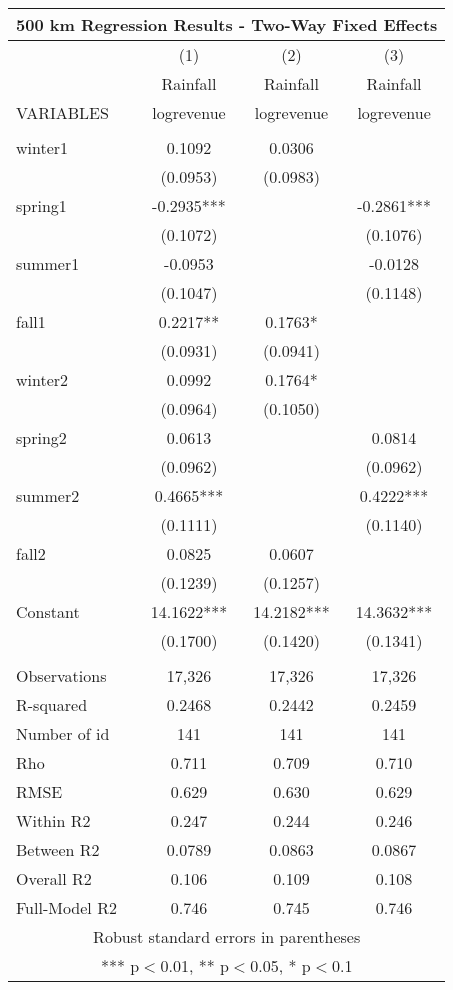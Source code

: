 \documentclass[]{article}
\begin{document}
\begin{tabular}{lccc}
\multicolumn{4}{c}{\huge 500 km Regression Results - Two-Way Fixed Effects} \\ \hline
 & (1) & (2) & (3) \\
 & \Large Rainfall & \Large Rainfall & \Large Rainfall \\
VARIABLES & logrevenue & logrevenue & logrevenue \\ \hline
 &  &  &  \\
winter1 & 0.1092 & 0.0306 &  \\
 & (0.0953) & (0.0983) &  \\
spring1 & -0.2935*** &  & -0.2861*** \\
 & (0.1072) &  & (0.1076) \\
summer1 & -0.0953 &  & -0.0128 \\
 & (0.1047) &  & (0.1148) \\
fall1 & 0.2217** & 0.1763* &  \\
 & (0.0931) & (0.0941) &  \\
winter2 & 0.0992 & 0.1764* &  \\
 & (0.0964) & (0.1050) &  \\
spring2 & 0.0613 &  & 0.0814 \\
 & (0.0962) &  & (0.0962) \\
summer2 & 0.4665*** &  & 0.4222*** \\
 & (0.1111) &  & (0.1140) \\
fall2 & 0.0825 & 0.0607 &  \\
 & (0.1239) & (0.1257) &  \\
Constant & 14.1622*** & 14.2182*** & 14.3632*** \\
 & (0.1700) & (0.1420) & (0.1341) \\
 &  &  &  \\
Observations & 17,326 & 17,326 & 17,326 \\
R-squared & 0.2468 & 0.2442 & 0.2459 \\
Number of id & 141 & 141 & 141 \\
Rho & 0.711 & 0.709 & 0.710 \\
RMSE & 0.629 & 0.630 & 0.629 \\
Within R2 & 0.247 & 0.244 & 0.246 \\
Between R2 & 0.0789 & 0.0863 & 0.0867 \\
Overall R2 & 0.106 & 0.109 & 0.108 \\
 Full-Model R2 & 0.746 & 0.745 & 0.746 \\ \hline
\multicolumn{4}{c}{ Robust standard errors in parentheses} \\
\multicolumn{4}{c}{ *** p$<$0.01, ** p$<$0.05, * p$<$0.1} \\
\end{tabular}
\end{document}
